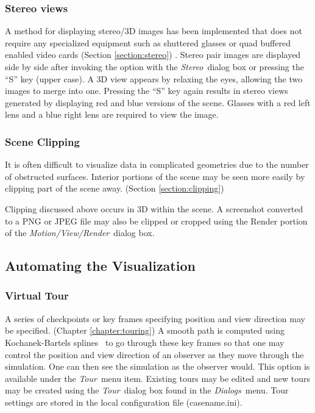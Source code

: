 \documentclass[11pt,twoside]{book}
\begin{document}
\subsubsection{Stereo views}A method for displaying stereo/3D images has been implemented that does
not require any specialized equipment such as shuttered glasses or quad buffered enabled video cards (Section \ref{section:stereo}) .  Stereo pair images are displayed side by side after invoking the option with
the {\em Stereo}\ dialog box or pressing the ``S'' key (upper case).  A 3D view appears by relaxing the eyes, allowing the two images to merge into one.
Pressing the ``S'' key again results in stereo views generated by displaying red and blue versions of the scene.  Glasses with a red left lens and a blue right lens are required to view the image.

\subsubsection{Scene Clipping} It is often difficult to visualize data
in complicated geometries due to the number of obstructed
surfaces. Interior portions of the scene may be seen more easily
by clipping part of the scene away. (Section
\ref{section:clipping})

Clipping discussed above occurs in 3D within the scene.  A
screenshot converted to a PNG or JPEG file may also be clipped or
cropped using the Render portion of the {\em Motion/View/Render}\
dialog box.

\subsection{Automating the Visualization}
\subsubsection{Virtual Tour}   A series of checkpoints or key frames
specifying position and view direction may be specified. (Chapter
\ref{chapter:touring}) A smooth path is computed using
Kochanek-Bartels splines~\cite{Moller:02} to go through these key frames so that one may control the position and view direction of
an observer as they move through the simulation. One can then see
the simulation as the observer would. This option is available
under the {\em Tour}\ menu item. Existing tours may be edited and
new tours may be created using the {\em Tour}\ dialog box found in
the {\em Dialogs}\ menu. Tour settings are stored in the local
configuration file (casename.ini).
\end{document}
